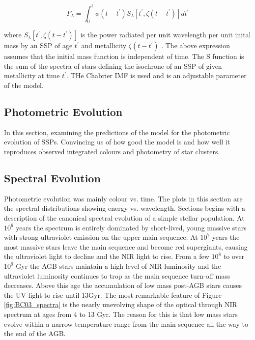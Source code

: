 \documentclass{literature}
\begin{document}
\begin{equation}
F_{\lambda} = \int ^{t} _{0} \phi(t - t^{\prime})S_{\lambda}[t^{\prime}, \zeta (t - t^{\prime})]dt^{\prime}
\end{equation}

where $S_{\lambda}[t^{\prime}, \zeta (t - t^{\prime})]$ is the power radiated per unit wavelength per unit inital mass by an SSP of age $t^{\prime}$ and metallicity $\zeta (t - t^{\prime})$ \citep{Tinsley1980}. The above expression assumes that the initial mass function is independent of time. The S function is the sum of the spectra of stars defining the isochrone of an SSP of given metallicity at time $t^{\prime}$. THe Chabrier IMF is used and is an adjustable parameter of the model. 


\subsection{Photometric Evolution}
In this section, examining the predictions of the model for the photometric evolution of SSPs. Convincing us of how good the model is and how well it reproduces observed integrated colours and photometry of star clusters. 

\subsection{Spectral Evolution}
Photometric evolution was mainly colour vs. time. The plots in this section are the spectral distributions showing energy vs. wavelength. Sections begins with a description of the canonical spectral evolution of a simple stellar population. At $10^{6}$ years the spectrum is entirely dominated by short-lived, young massive stars with strong ultraviolet emission on the upper main sequence. At $10^{7}$ years the most massive stars leave the main sequence and become red supergiants, causing the ultraviolet light to decline and the NIR light to rise. From a few $10^{8}$ to over $10^{9}$ Gyr the AGB stars maintain a high level of NIR luminosity and the ultraviolet luminosity continues to trop as the  main sequence turn-off mass decreases. Above this age the accumulation of low mass post-AGB stars causes the UV light to rise until 13Gyr. The most remarkable feature of Figure \ref{fig:BC03_spectra} is the nearly unevolving shape of the optical through NIR spectrum at ages from 4 to 13 Gyr. The reason for this is that low mass stars evolve within a narrow temperature range from the main sequence all the way to the end of the AGB.  
\end{document}
